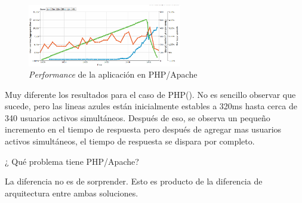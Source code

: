 

\begin{figure}[h!]
	\centering
	\includegraphics[width=0.6\textwidth]{figuras/cap2/phpapache_benchmak_loadimpact.png}
	\caption{\textit{Performance} de la aplicación en PHP/Apache}
	\label{figure:php_benchmark_nodephp}
\end{figure}

Muy diferente los resultados para el caso de PHP(). No es sencillo observar que sucede, pero las lineas azules están inicialmente estables a 320ms hasta cerca de 340 usuarios activos simultáneos. Después de eso, se observa un pequeño incremento en el tiempo de respuesta pero después de agregar mas usuarios activos simultáneos, el tiempo de respuesta se dispara por completo. 

¿ Qué problema tiene PHP/Apache?

La diferencia no es de sorprender. Esto es producto de la diferencia de arquitectura entre ambas soluciones.

